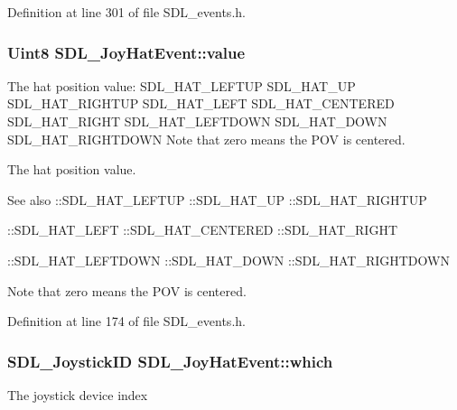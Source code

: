 Definition at line 301 of file S\+D\+L\+\_\+events.\+h.

\hypertarget{structSDL__JoyHatEvent_a52b179a34407449941b61d988ca72ef4}{
\subsubsection[{value}]{\setlength{\rightskip}{0pt plus 5cm}Uint8 S\+D\+L\+\_\+\+Joy\+Hat\+Event\+::value}}\label{structSDL__JoyHatEvent_a52b179a34407449941b61d988ca72ef4}
The hat position value\+: S\+D\+L\+\_\+\+H\+A\+T\+\_\+\+L\+E\+F\+T\+U\+P S\+D\+L\+\_\+\+H\+A\+T\+\_\+\+U\+P S\+D\+L\+\_\+\+H\+A\+T\+\_\+\+R\+I\+G\+H\+T\+U\+P S\+D\+L\+\_\+\+H\+A\+T\+\_\+\+L\+E\+F\+T S\+D\+L\+\_\+\+H\+A\+T\+\_\+\+C\+E\+N\+T\+E\+R\+E\+D S\+D\+L\+\_\+\+H\+A\+T\+\_\+\+R\+I\+G\+H\+T S\+D\+L\+\_\+\+H\+A\+T\+\_\+\+L\+E\+F\+T\+D\+O\+W\+N S\+D\+L\+\_\+\+H\+A\+T\+\_\+\+D\+O\+W\+N S\+D\+L\+\_\+\+H\+A\+T\+\_\+\+R\+I\+G\+H\+T\+D\+O\+W\+N Note that zero means the P\+O\+V is centered.

The hat position value. \begin{DoxySeeAlso}{See also}
\+::\+S\+D\+L\+\_\+\+H\+A\+T\+\_\+\+L\+E\+F\+T\+U\+P \+::\+S\+D\+L\+\_\+\+H\+A\+T\+\_\+\+U\+P \+::\+S\+D\+L\+\_\+\+H\+A\+T\+\_\+\+R\+I\+G\+H\+T\+U\+P 

\+::\+S\+D\+L\+\_\+\+H\+A\+T\+\_\+\+L\+E\+F\+T \+::\+S\+D\+L\+\_\+\+H\+A\+T\+\_\+\+C\+E\+N\+T\+E\+R\+E\+D \+::\+S\+D\+L\+\_\+\+H\+A\+T\+\_\+\+R\+I\+G\+H\+T 

\+::\+S\+D\+L\+\_\+\+H\+A\+T\+\_\+\+L\+E\+F\+T\+D\+O\+W\+N \+::\+S\+D\+L\+\_\+\+H\+A\+T\+\_\+\+D\+O\+W\+N \+::\+S\+D\+L\+\_\+\+H\+A\+T\+\_\+\+R\+I\+G\+H\+T\+D\+O\+W\+N
\end{DoxySeeAlso}
Note that zero means the P\+O\+V is centered. 

Definition at line 174 of file S\+D\+L\+\_\+events.\+h.

\hypertarget{structSDL__JoyHatEvent_ac9d9bb179f9116d16b3da47cacd74b55}{
\subsubsection[{which}]{\setlength{\rightskip}{0pt plus 5cm}S\+D\+L\+\_\+\+Joystick\+I\+D S\+D\+L\+\_\+\+Joy\+Hat\+Event\+::which}}\label{structSDL__JoyHatEvent_ac9d9bb179f9116d16b3da47cacd74b55}
The joystick device index

